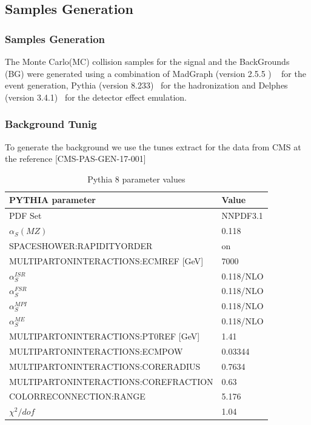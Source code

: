 \documentclass{beamer}
\begin{document}
\begin{frame}
\section{Samples Generation}
\frametitle{Samples Generation}
\begin{justify}
	The Monte Carlo(MC) collision samples for the signal and the BackGrounds (BG) were generated using a combination of MadGraph (version 2.5.5 ) ~%
	for the event generation, Pythia (version 8.233)~  %
	for the hadronization and Delphes (version 3.4.1)~  %
	for the detector effect emulation.
\end{justify}

\end{frame}

\begin{frame}
\frametitle{Background Tunig}
{\small To generate the background we use the tunes extract for the data from CMS at the reference [CMS-PAS-GEN-17-001] }

{\scriptsize
\begin{table}[]
	\begin{tabular}{ll}
		\hline
		\textbf{PYTHIA parameter}                & \textbf{Value} \\\hline
		PDF Set                                  & NNPDF3.1       \\
		$\alpha_S(MZ)$                           & 0.118          \\
		SPACESHOWER:RAPIDITYORDER                & on             \\
		MULTIPARTONINTERACTIONS:ECMREF {[}GeV{]} & 7000           \\
		$\alpha^{ISR}_S$                         & 0.118/NLO      \\
		$\alpha^{FSR}_S$                         & 0.118/NLO      \\
		$\alpha^{MPI}_S$                         & 0.118/NLO      \\
		$\alpha^{ME}_S$                          & 0.118/NLO      \\
		MULTIPARTONINTERACTIONS:PT0REF {[}GeV{]} & 1.41           \\
		MULTIPARTONINTERACTIONS:ECMPOW           & 0.03344        \\
		MULTIPARTONINTERACTIONS:CORERADIUS       & 0.7634         \\
		MULTIPARTONINTERACTIONS:COREFRACTION     & 0.63           \\
		COLORRECONNECTION:RANGE                  & 5.176          \\
		$\chi^2/dof$                             & 1.04           \\\hline
	\end{tabular}
		\caption{Pythia 8 parameter values }
		\label{PythiaTune}

\end{table}
}

\end{frame}
\end{document}
